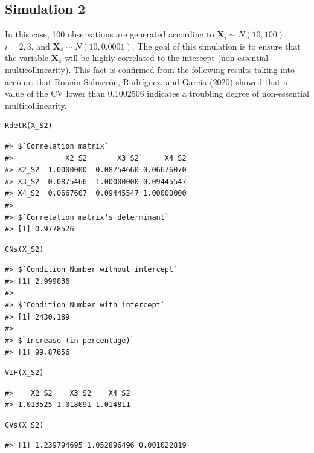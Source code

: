 \hypertarget{simulation-2}{%
\subsection{Simulation 2}\label{simulation-2}}

In this case, 100 observations are generated according to \(\mathbf{X}_{i} \sim N(10, 100)\), \(i=2,3\), and \(\mathbf{X}_{4} \sim N(10, 0.0001)\). The goal of this simulation is to ensure that the variable \(\mathbf{X}_{4}\) will be highly correlated to the intercept (non-essential multicollinearity). This fact is confirmed from the following results taking into account that Román Salmerón, Rodríguez, and García (2020) showed that a value of the CV lower than 0.1002506 indicates a troubling degree of non-essential multicollinearity.

\begin{verbatim}
RdetR(X_S2)
\end{verbatim}

\begin{verbatim}
#> $`Correlation matrix`
#>            X2_S2       X3_S2      X4_S2
#> X2_S2  1.0000000 -0.08754660 0.06676070
#> X3_S2 -0.0875466  1.00000000 0.09445547
#> X4_S2  0.0667607  0.09445547 1.00000000
#> 
#> $`Correlation matrix's determinant`
#> [1] 0.9778526
\end{verbatim}

\begin{verbatim}
CNs(X_S2)
\end{verbatim}

\begin{verbatim}
#> $`Condition Number without intercept`
#> [1] 2.999836
#> 
#> $`Condition Number with intercept`
#> [1] 2430.189
#> 
#> $`Increase (in percentage)`
#> [1] 99.87656
\end{verbatim}

\begin{verbatim}
VIF(X_S2)
\end{verbatim}

\begin{verbatim}
#>    X2_S2    X3_S2    X4_S2 
#> 1.013525 1.018091 1.014811
\end{verbatim}

\begin{verbatim}
CVs(X_S2)
\end{verbatim}

\begin{verbatim}
#> [1] 1.239794695 1.052896496 0.001022819
\end{verbatim}

